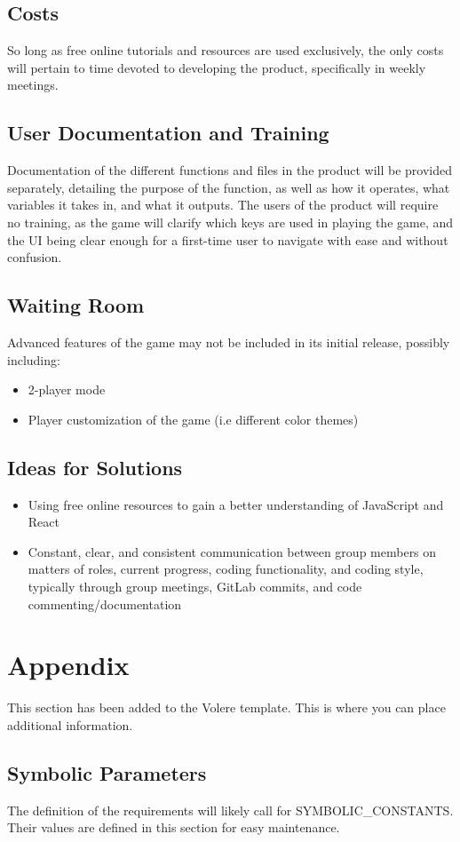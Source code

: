 \documentclass[12pt, titlepage]{article}
\begin{document}
\subsection{Costs}
So long as free online tutorials and resources are used exclusively, the only costs will pertain to time devoted to developing the product, specifically in weekly meetings.

\subsection{User Documentation and Training}
Documentation of the different functions and files in the product will be provided separately, detailing the purpose of the function, as well as how it operates, what variables it takes in, and what it outputs. 
The users of the product will require no training, as the game will clarify which keys are used in playing the game, and the UI being clear enough for a first-time user to navigate with ease and without confusion.

\subsection{Waiting Room}
Advanced features of the game may not be included in its initial release, possibly including:
\begin{itemize}
    \item 2-player mode
    \item Player customization of the game (i.e different color themes)
\end{itemize}

\subsection{Ideas for Solutions}
\begin{itemize}
    \item Using free online resources to gain a better understanding of JavaScript and React
    \item Constant, clear, and consistent communication between group members on matters of roles, current progress, coding functionality, and coding style, typically through group meetings, GitLab commits, and code commenting/documentation
\end{itemize}





\newpage

\section{Appendix}

This section has been added to the Volere template.  This is where you can place
additional information.

\subsection{Symbolic Parameters}

The definition of the requirements will likely call for SYMBOLIC\_CONSTANTS.
Their values are defined in this section for easy maintenance.
\end{document}
